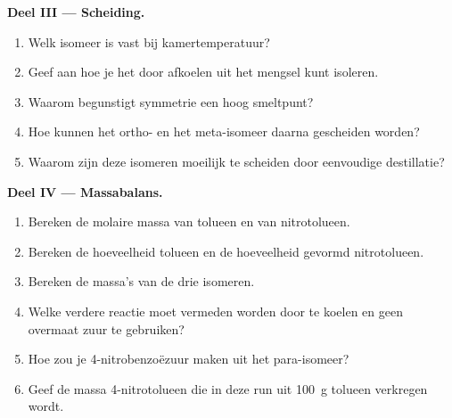 \begin{problem}
\medskip
\noindent\textbf{Deel III --- Scheiding.}
\begin{enumerate}[resume]
  \item Welk isomeer is vast bij kamertemperatuur?
  \item Geef aan hoe je het door afkoelen uit het mengsel kunt isoleren.
  \item Waarom begunstigt symmetrie een hoog smeltpunt?
  \item Hoe kunnen het ortho- en het meta-isomeer daarna gescheiden worden?
  \item Waarom zijn deze isomeren moeilijk te scheiden door eenvoudige destillatie?
\end{enumerate}

\medskip
\noindent\textbf{Deel IV --- Massabalans.}
\begin{enumerate}[resume]
  \item Bereken de molaire massa van tolueen en van nitrotolueen.
  \item Bereken de hoeveelheid tolueen en de hoeveelheid gevormd nitrotolueen.
  \item Bereken de massa's van de drie isomeren.
  \item Welke verdere reactie moet vermeden worden door te koelen en geen overmaat zuur te gebruiken?
  \item Hoe zou je 4-nitrobenzoëzuur maken uit het para-isomeer?
  \item Geef de massa 4-nitrotolueen die in deze run uit \qty{100}{g} tolueen verkregen wordt.
\end{enumerate}
\end{problem}
